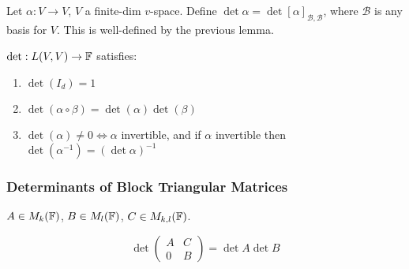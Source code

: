 \documentclass[a4paper]{article}
\begin{document}
\begin{defi}
	Let $ \alpha : V \to V $, $ V $ a finite-dim $ v $-space. Define $ \det \alpha = \det [\alpha]_{\mathcal{B},\mathcal{B}} $, where $ \mathcal{B} $ is any basis for $ V $. This is well-defined by the previous lemma.  
\end{defi}

\begin{thm} 
	$ \det: L(V,V) \to \mathbb{F} $ satisfies:
	\begin{enumerate}
		\item $ \det(I_{d}) = 1 $
		\item $ \det(\alpha \circ \beta) = \det(\alpha) \det(\beta) $
		\item $ \det(\alpha) \neq 0 \iff \alpha $ invertible, and if $ \alpha $ invertible then $ \det(\alpha^{-1}) = (\det \alpha)^{-1} $
	\end{enumerate}
\end{thm}

\subsubsection{Determinants of Block Triangular Matrices}

\begin{lemma} 
	$ A \in M_{k}(\mathbb{F}) $, $ B \in M_{l}(\mathbb{F}) $, $ C \in M_{k,l}(\mathbb{F}) $.
	
	\[ \det \begin{pmatrix}
	A & C\\
	0 & B
	\end{pmatrix}  = \det A \det B\]
\end{lemma}
\end{document}
